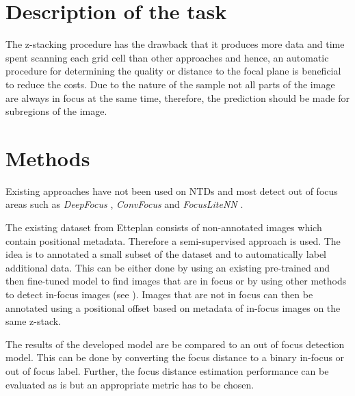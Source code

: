 \documentclass[a4paper,11pt]{article}
\begin{document}
\section{Description of the task}


The z-stacking procedure has the drawback that it produces more data and time spent scanning each grid cell than other approaches and hence, an automatic procedure for determining the quality or distance to the focal plane is beneficial to reduce the costs. Due to the nature of the sample not all parts of the image are always in focus at the same time, therefore, the prediction should be made for subregions of the image. 


\section{Methods}


Existing approaches have not been used on NTDs and most detect out of focus areas such as \emph{DeepFocus} \cite{senaras2018deepfocus}, \emph{ConvFocus} \cite{kohlberger2019wholeslide} and \emph{FocusLiteNN} \cite{wang2020focuslitenn}.

The existing dataset from Etteplan consists of non-annotated images which contain positional metadata. Therefore a semi-supervised approach is used. The idea is to annotated a small subset of the dataset and to automatically label additional data. This can be either done by using an existing pre-trained and then fine-tuned model to find images that are in focus or by using other methods to detect in-focus images (see \citeauthor{yusun2005autofocusing} \cite{yusun2005autofocusing}). Images that are not in focus can then be annotated using a positional offset based on metadata of in-focus images on the same z-stack.

The results of the developed model are be compared to an out of focus detection model. This can be done by converting the focus distance to a binary in-focus or out of focus label. Further, the focus distance estimation performance can be evaluated as is but an appropriate metric has to be chosen.
\end{document}
